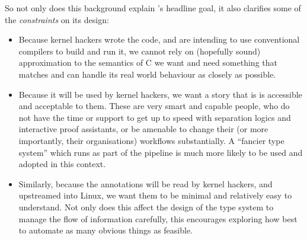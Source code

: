 So not only does this background explain 's headline goal, it also
clarifies some of the \emph{constraints} on its design:
\begin{itemize}
    \item Because kernel hackers wrote the code, and are intending to use
        conventional compilers to build and run it, we
        cannot rely on (hopefully sound) approximation to the semantics of C
        \textemdash{} we want and need something that matches and can handle
        its real world behaviour as closely as possible.
    \item Because it will be used by kernel hackers, we want a story that is
        is accessible and acceptable to them. These are very smart and
        capable people, who do not have the time or support to get up to
        speed with separation logics and interactive proof assistants, or be
        amenable to change their (or more importantly, their organisations)
        workflows substantially. A ``fancier type system'' which runs as part of
        the  pipeline is much more
        likely to be used and adopted in this context.
    \item Similarly, because the annotations will be read by kernel hackers,
        and upstreamed into Linux, we want them to be minimal and relatively
        easy to understand. Not only does this affect the design of the type
        system to manage the flow of information carefully, this encourages
        exploring how best to automate as many obvious things as feasible.
\end{itemize}

